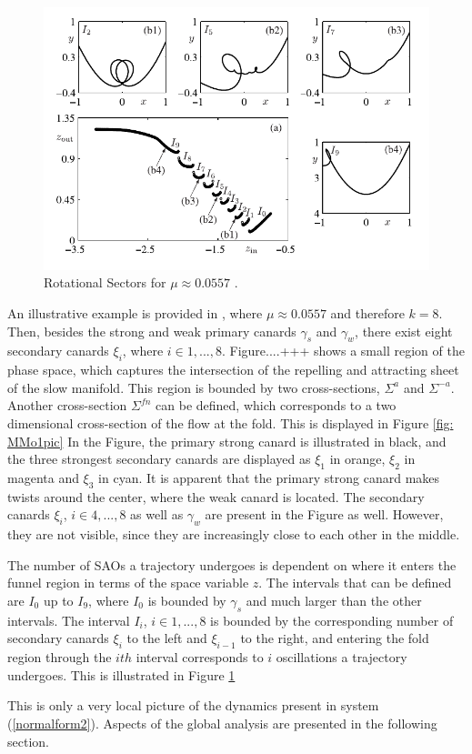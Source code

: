 \begin{figure}[h!]\centering
	\includegraphics{Images/MMO2}
	\caption{Rotational Sectors for $\mu \approx 0.0557$ \citep{MMO}.}
	\label{fig: MMo2pic}
\end{figure}


An illustrative example is provided in \citep{MMO}, where $ \mu \approx 0.0557$ and therefore $k=8$. Then, besides the strong and weak primary canards $\gamma_s$ and $\gamma_w$, there exist eight secondary canards $\xi_i$, where $ i \in 1,...,8$.
Figure....+++ shows a small region of the phase space, which captures the intersection of the repelling and attracting sheet of the slow manifold. This region is bounded by two cross-sections, $\Sigma^a$ and $\Sigma^{-a}$.
Another cross-section $\Sigma^{fn}$ can be defined, which corresponds to a two dimensional cross-section of the flow at the fold. This is displayed in Figure \ref{fig: MMo1pic}
In the Figure, the primary strong canard is illustrated in black, and the three strongest secondary canards are displayed as $\xi_1$ in orange, $\xi_2$ in magenta and $\xi_3$ in cyan.
It is apparent that the primary strong canard makes  twists around the center, where the weak canard is located. The secondary canards $\xi_i$, $ i \in 4,...,8$ as well as $\gamma_w$ are present in the Figure as well. However, they are not visible, since they are increasingly close to each other in the middle.

The number of SAOs a trajectory undergoes is dependent on where it enters the funnel region in terms of the space variable $z$. The intervals that can be defined are $I_0$ up to $I_9$, where $I_0$ is bounded by $\gamma_s$ and much larger than the other intervals. The interval $I_i$, $i \in 1, ..., 8$ is bounded by the corresponding number of secondary canards $\xi_i$ to the left and $\xi_{i-1}$ to the right, and entering the fold region through the $ith$ interval corresponds to $i$ oscillations a trajectory undergoes. This is illustrated in Figure \ref{fig: MMo2pic}

This is only a very local picture of the dynamics present in system (\ref{normalform2}). Aspects of the global analysis are presented in the following section.
